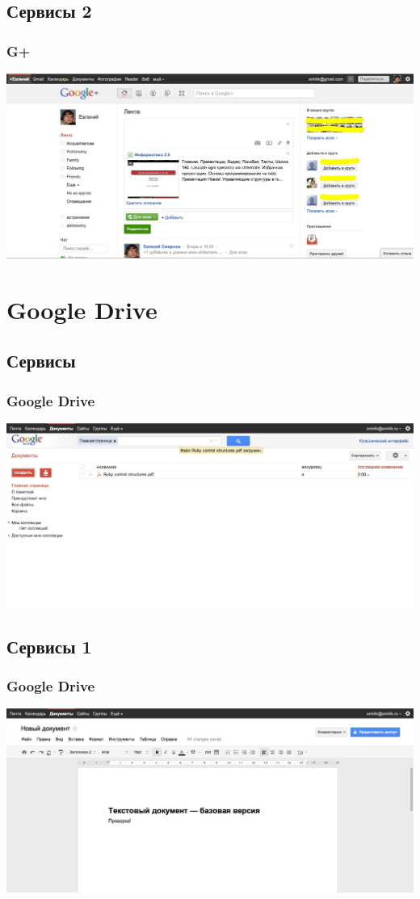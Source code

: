 \documentclass[compress,red]{beamer}
\begin{document}
\subsection{Сервисы 2}
\begin{frame}
  \frametitle{G+}
	\centerline{\includegraphics[width=1.0\textwidth]{images/gplus1.jpg}}
\end{frame}

\section{Google Drive}
\subsection{Сервисы}
\begin{frame}
  \frametitle{Google Drive}
	\centerline{\includegraphics[width=1.0\textwidth]{images/gdocs1.jpg}}
\end{frame}

\subsection{Сервисы 1}
\begin{frame}
  \frametitle{Google Drive}
	\centerline{\includegraphics[width=1.0\textwidth]{images/gdocs2.jpg}}
\end{frame}
\end{document}
